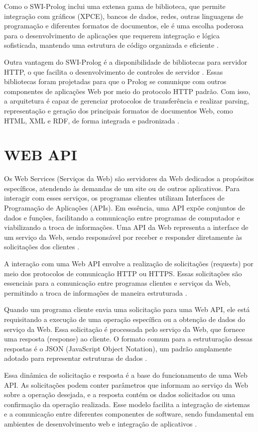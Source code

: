 Como o SWI-Prolog inclui uma extensa gama de biblioteca, que permite integração com gráficos (XPCE), bancos de dados, redes, outras linguagens de programação e diferentes formatos de documentos, ele é uma escolha poderosa para o desenvolvimento de aplicações que requerem integração e lógica sofisticada, mantendo uma estrutura de código organizada e eficiente \cite[p.~1]{wielemakerswiprologversion7}.

Outra vantagem do SWI-Prolog é a disponibilidade de bibliotecas para servidor HTTP, o que facilita o desenvolvimento de controles de servidor \cite{wielemakerswish}. Essas bibliotecas foram projetadas para que o Prolog se comunique com outros componentes de aplicações Web por meio do protocolo HTTP padrão. Com isso, a arquitetura é capaz de gerenciar protocolos de transferência e realizar parsing, representação e geração dos principais formatos de documentos Web, como HTML, XML e RDF, de forma integrada e padronizada \cite{wielemaker}.

\section{WEB API}

Os Web Services (Serviços da Web) são servidores da Web dedicados a propósitos específicos, atendendo às demandas de um site ou de outros aplicativos. Para interagir com esses serviços, os programas clientes utilizam Interfaces de Programação de Aplicações (APIs). Em essência, uma API expõe conjuntos de dados e funções, facilitando a comunicação entre programas de computador e viabilizando a troca de informações. Uma API da Web representa a interface de um serviço da Web, sendo responsável por receber e responder diretamente às solicitações dos clientes \cite[p.~5]{masse}.

A interação com uma Web API envolve a realização de solicitações (requests) por meio dos protocolos de comunicação HTTP ou HTTPS. Essas solicitações são essenciais para a comunicação entre programas clientes e serviços da Web, permitindo a troca de informações de maneira estruturada \cite[p.~18-20]{richardson}. 

Quando um programa cliente envia uma solicitação para uma Web API, ele está requisitando a execução de uma operação específica ou a obtenção de dados do serviço da Web. Essa solicitação é processada pelo serviço da Web, que fornece uma resposta (response) ao cliente. O formato comum para a estruturação dessas respostas é o JSON (JavaScript Object Notation), um padrão amplamente adotado para representar estruturas de dados \cite[p.~19-21]{richardson}. 

Essa dinâmica de solicitação e resposta é a base do funcionamento de uma Web API. As solicitações podem conter parâmetros que informam ao serviço da Web sobre a operação desejada, e a resposta contém os dados solicitados ou uma confirmação da operação realizada. Esse modelo facilita a integração de sistemas e a comunicação entre diferentes componentes de software, sendo fundamental em ambientes de desenvolvimento web e integração de aplicativos \cite[p.~20-23]{richardson}.
